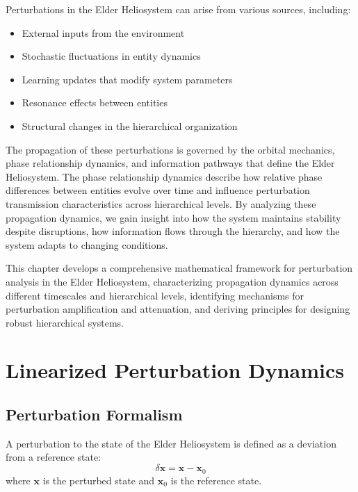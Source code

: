 Perturbations in the Elder Heliosystem can arise from various sources, including:
\begin{itemize}
    \item External inputs from the environment
    \item Stochastic fluctuations in entity dynamics
    \item Learning updates that modify system parameters
    \item Resonance effects between entities
    \item Structural changes in the hierarchical organization
\end{itemize}

The propagation of these perturbations is governed by the orbital mechanics, phase relationship dynamics, and information pathways that define the Elder Heliosystem. The phase relationship dynamics describe how relative phase differences between entities evolve over time and influence perturbation transmission characteristics across hierarchical levels. By analyzing these propagation dynamics, we gain insight into how the system maintains stability despite disruptions, how information flows through the hierarchy, and how the system adapts to changing conditions.

This chapter develops a comprehensive mathematical framework for perturbation analysis in the Elder Heliosystem, characterizing propagation dynamics across different timescales and hierarchical levels, identifying mechanisms for perturbation amplification and attenuation, and deriving principles for designing robust hierarchical systems.

\section{Linearized Perturbation Dynamics}

\subsection{Perturbation Formalism}

\begin{definition}
A perturbation to the state of the Elder Heliosystem is defined as a deviation from a reference state:
\begin{equation}
\delta\mathbf{x} = \mathbf{x} - \mathbf{x}_0
\end{equation}
where $\mathbf{x}$ is the perturbed state and $\mathbf{x}_0$ is the reference state.
\end{definition}

